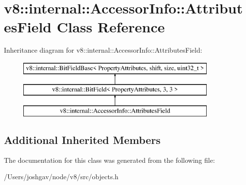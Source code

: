 \hypertarget{classv8_1_1internal_1_1_accessor_info_1_1_attributes_field}{}\section{v8\+:\+:internal\+:\+:Accessor\+Info\+:\+:Attributes\+Field Class Reference}
\label{classv8_1_1internal_1_1_accessor_info_1_1_attributes_field}
Inheritance diagram for v8\+:\+:internal\+:\+:Accessor\+Info\+:\+:Attributes\+Field\+:\begin{figure}[H]
\begin{center}
\leavevmode
\includegraphics[height=3.000000cm]{classv8_1_1internal_1_1_accessor_info_1_1_attributes_field}
\end{center}
\end{figure}
\subsection*{Additional Inherited Members}


The documentation for this class was generated from the following file\+:\begin{DoxyCompactItemize}
\item 
/\+Users/joshgav/node/v8/src/objects.\+h\end{DoxyCompactItemize}
